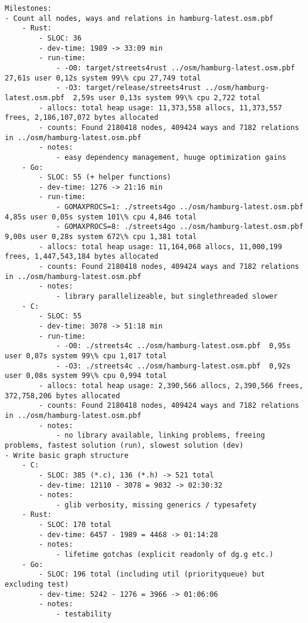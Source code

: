 \begin{verbatim}
Milestones:
- Count all nodes, ways and relations in hamburg-latest.osm.pbf
    - Rust:
        - SLOC: 36
        - dev-time: 1989 -> 33:09 min
        - run-time:
            - -O0: target/streets4rust ../osm/hamburg-latest.osm.pbf  27,61s user 0,12s system 99\% cpu 27,749 total
            - -O3: target/release/streets4rust ../osm/hamburg-latest.osm.pbf  2,59s user 0,13s system 99\% cpu 2,722 total
        - allocs: total heap usage: 11,373,558 allocs, 11,373,557 frees, 2,186,107,072 bytes allocated
        - counts: Found 2180418 nodes, 409424 ways and 7182 relations in ../osm/hamburg-latest.osm.pbf
        - notes:
            - easy dependency management, huuge optimization gains
    - Go:
        - SLOC: 55 (+ helper functions)
        - dev-time: 1276 -> 21:16 min
        - run-time:
            - GOMAXPROCS=1: ./streets4go ../osm/hamburg-latest.osm.pbf  4,85s user 0,05s system 101\% cpu 4,846 total
            - GOMAXPROCS=8: ./streets4go ../osm/hamburg-latest.osm.pbf  9,00s user 0,28s system 672\% cpu 1,381 total
        - allocs: total heap usage: 11,164,068 allocs, 11,000,199 frees, 1,447,543,184 bytes allocated
        - counts: Found 2180418 nodes, 409424 ways and 7182 relations in ../osm/hamburg-latest.osm.pbf
        - notes:
            - library parallelizeable, but singlethreaded slower
    - C:
        - SLOC: 55
        - dev-time: 3078 -> 51:18 min
        - run-time:
            - -O0: ./streets4c ../osm/hamburg-latest.osm.pbf  0,95s user 0,07s system 99\% cpu 1,017 total
            - -O3: ./streets4c ../osm/hamburg-latest.osm.pbf  0,92s user 0,08s system 99\% cpu 0,994 total
        - allocs: total heap usage: 2,390,566 allocs, 2,390,566 frees, 372,758,206 bytes allocated
        - counts: Found 2180418 nodes, 409424 ways and 7182 relations in ../osm/hamburg-latest.osm.pbf
        - notes:
            - no library available, linking problems, freeing problems, fastest solution (run), slowest solution (dev)
- Write basic graph structure
    - C:
        - SLOC: 385 (*.c), 136 (*.h) -> 521 total
        - dev-time: 12110 - 3078 = 9032 -> 02:30:32
        - notes:
            - glib verbosity, missing generics / typesafety
    - Rust:
        - SLOC: 170 total
        - dev-time: 6457 - 1989 = 4468 -> 01:14:28
        - notes:
            - lifetime gotchas (explicit readonly of dg.g etc.)
    - Go:
        - SLOC: 196 total (including util (priorityqueue) but excluding test)
        - dev-time: 5242 - 1276 = 3966 -> 01:06:06
        - notes:
            - testability
\end{verbatim}

